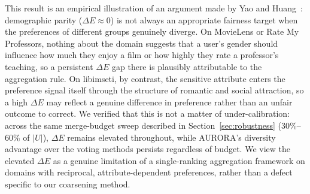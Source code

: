 \documentclass[runningheads]{llncs}
\begin{document}
This result is an empirical illustration of an argument made by Yao and
Huang~\cite{yao_new_2017}: demographic parity ($\Delta E \approx 0$) is not
always an appropriate fairness target when the preferences of different
groups genuinely diverge. On MovieLens or Rate My Professors, nothing
about the domain suggests that a user's gender should influence how much
they enjoy a film or how highly they rate a professor's teaching, so a
persistent $\Delta E$ gap there is plausibly attributable to the
aggregation rule. On libimseti, by contrast, the sensitive attribute
enters the preference signal itself through the structure of romantic and
social attraction, so a high $\Delta E$ may reflect a genuine difference
in preference rather than an unfair outcome to correct. We verified that
this is not a matter of under-calibration: across the same merge-budget
sweep described in Section~\ref{sec:robustness} (30\%--60\% of $|U|$),
$\Delta E$ remains elevated throughout, while AURORA's diversity advantage
over the voting methods persists regardless of budget. We view the
elevated $\Delta E$ as a genuine limitation of a single-ranking
aggregation framework on domains with reciprocal, attribute-dependent
preferences, rather than a defect specific to our coarsening method.
\end{document}
